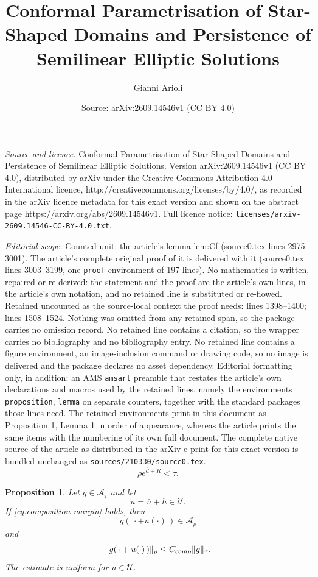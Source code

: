 \documentclass[10pt,a4paper]{amsart}
\title{Conformal Parametrisation of Star-Shaped Domains and Persistence of Semilinear Elliptic Solutions}
\author{Gianni Arioli}
\date{Source: arXiv:2609.14546v1 (CC BY 4.0)}
\newtheorem{proposition}{Proposition}
\begin{document}
\maketitle

\noindent\emph{Source and licence.} Conformal Parametrisation of Star-Shaped Domains and Persistence of Semilinear Elliptic Solutions. Version arXiv:2609.14546v1 (CC BY 4.0), distributed by arXiv under the Creative Commons Attribution 4.0 International licence, http://creativecommons.org/licenses/by/4.0/, as recorded in the arXiv licence metadata for this exact version and shown on the abstract page https://arxiv.org/abs/2609.14546v1. Full licence notice: \texttt{licenses/arxiv-2609.14546-CC-BY-4.0.txt}.\par\smallskip

\noindent\textit{Editorial scope.} Counted unit: the article's lemma lem:Cf (source0.tex lines 2975--3001). The article's complete original proof of it is delivered with it (source0.tex lines 3003--3199, one \texttt{proof} environment of 197 lines). No mathematics is written, repaired or re-derived: the statement and the proof are the article's own lines, in the article's own notation, and no retained line is substituted or re-flowed.  Retained uncounted as the source-local context the proof needs: lines 1398--1400; lines 1508--1524.  Nothing was omitted from any retained span, so the package carries no omission record.  No retained line contains a citation, so the wrapper carries no bibliography and no bibliography entry.  No retained line contains a figure environment, an image-inclusion command or drawing code, so no image is delivered and the package declares no asset dependency.  Editorial formatting only, in addition: an AMS \texttt{amsart} preamble that restates the article's own declarations and macros used by the retained lines, namely the environments \texttt{proposition}, \texttt{lemma} on separate counters, together with the standard packages those lines need.  The retained environments print in this document as Proposition 1, Lemma 1 in order of appearance, whereas the article prints the same items with the numbering of its own full document.  The complete native source of the article as distributed in the arXiv e-print for this exact version is bundled unchanged as \texttt{sources/210330/source0.tex}.
\begin{equation}\label{eq:composition-margin}
	\rho e^{\bar d+R}<\tau.
\end{equation}

\begin{proposition}\label{prop:composition-strip}
	Let $g\in\mathcal A_\tau$ and let
	\[
	u=\bar u+h\in\mathcal U.
	\]
	If \eqref{eq:composition-margin} holds, then
	\[
	g(\,\cdot+u(\cdot)\,)\in\mathcal A_\rho
	\]
	and
	\begin{equation}\label{eq:composition-strip}
		\|g(\,\cdot+u(\cdot)\,)\|_\rho
		\le
		C_{\rm comp}\|g\|_\tau.
	\end{equation}
	The estimate is uniform for $u\in\mathcal U$.
\end{proposition}
\end{document}
